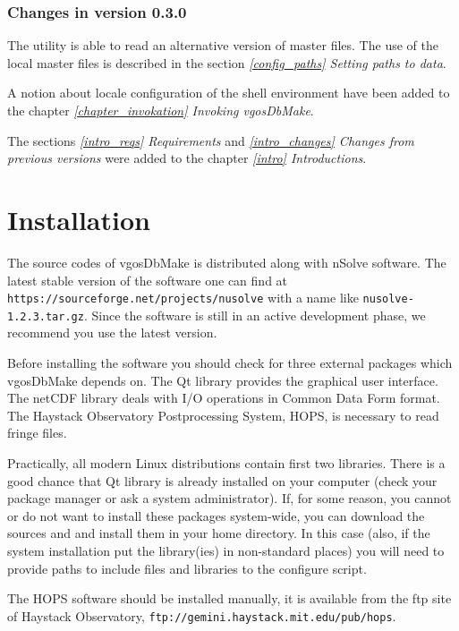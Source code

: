 \documentclass [10pt,letterpaper]{report}
\newcommand{\nuSolve}{\greektext n\latintext Solve}
\begin{document}
\subsection{Changes in version 0.3.0}
The utility is able to read an alternative version of master files. The
use of the local master files is described in the section
\emph{\ref{config_paths} Setting paths to data}.

A notion about locale configuration of the shell environment have been
added to the chapter \emph{\ref{chapter_invokation} Invoking vgosDbMake}.

The sections \emph{\ref{intro_reqs} Requirements} and
\emph{\ref{intro_changes} Changes from previous versions} were added to
the chapter \emph{\ref{intro} Introductions}.







%
%
\chapter{Installation}


The source codes of vgosDbMake is distributed along with \nuSolve{}
software. The latest stable version of the software one can find at
{\tt https://sourceforge.net/projects/nusolve} with a name like
{\tt nusolve-1.2.3.tar.gz}. Since the software is still in an active
development phase, we recommend you use the latest version.

Before installing the software you should check for three external
packages which vgosDbMake depends on. The Qt library provides the
graphical user interface. The netCDF library deals with I/O operations
in Common Data Form format. The Haystack Observatory Postprocessing
System, HOPS, is necessary to read fringe files.

Practically, all modern Linux distributions contain first two libraries.
There is a good chance that Qt library is already installed on your
computer (check your package manager or ask a system administrator). If,
for some reason, you cannot or do not want to install these packages
system-wide, you can download the sources and and install them in your
home directory. In this case (also, if the system installation put the
library(ies) in non-standard places) you will need to provide paths to
include files and libraries to the configure script.

The HOPS software should be installed manually, it is available from
the ftp site of Haystack Observatory, {\tt ftp://gemini.haystack.mit.edu/pub/hops}.
\end{document}
